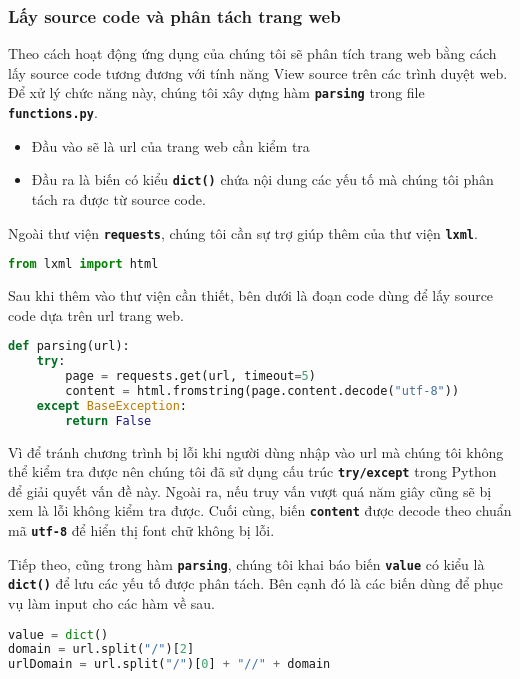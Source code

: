\subsubsection{Lấy source code và phân tách trang web}
Theo cách hoạt động ứng dụng của chúng tôi sẽ phân tích trang web bằng cách lấy source code tương đương với tính năng View source trên các trình duyệt web. Để xử lý chức năng này, chúng tôi xây dựng hàm \textbf{\texttt{parsing}} trong file \textbf{\texttt{functions.py}}.
\begin{itemize}
    \item Đầu vào sẽ là url của trang web cần kiểm tra
    \item Đầu ra là biến có kiểu \textbf{\texttt{dict()}} chứa nội dung các yếu tố mà chúng tôi phân tách ra được từ source code.
\end{itemize}
\par
Ngoài thư viện \textbf{\texttt{requests}}, chúng tôi cần sự trợ giúp thêm của thư viện \textbf{\texttt{lxml}}.
\begin{lstlisting}[language=Python]
from lxml import html
\end{lstlisting}
\par
Sau khi thêm vào thư viện cần thiết, bên dưới là đoạn code dùng để lấy source code dựa trên url trang web.
\begin{lstlisting}[language=Python]
def parsing(url):
    try:
        page = requests.get(url, timeout=5)
        content = html.fromstring(page.content.decode("utf-8"))
    except BaseException:
        return False
\end{lstlisting}
\par
Vì để tránh chương trình bị lỗi khi người dùng nhập vào url mà chúng tôi không thể kiểm tra được nên chúng tôi đã sử dụng cấu trúc \textbf{\texttt{try/except}} trong Python để giải quyết vấn đề này. Ngoài ra, nếu truy vấn vượt quá năm giây cũng sẽ bị xem là lỗi không kiểm tra được. Cuối cùng, biến \textbf{\texttt{content}} được decode theo chuẩn mã \textbf{\texttt{utf-8}} để hiển thị font chữ không bị lỗi.
\par
Tiếp theo, cũng trong hàm \textbf{\texttt{parsing}}, chúng tôi khai báo biến \textbf{\texttt{value}} có kiểu là \textbf{\texttt{dict()}} để lưu các yếu tố được phân tách. Bên cạnh đó là các biến dùng để phục vụ làm input cho các hàm về sau.
\begin{lstlisting}[language=Python]
value = dict()
domain = url.split("/")[2]
urlDomain = url.split("/")[0] + "//" + domain    
\end{lstlisting}
